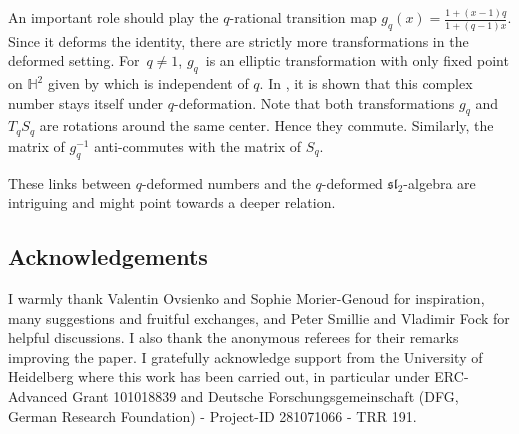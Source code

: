\documentclass[pdftex]{sigma}
\numberwithin{equation}{section}
\renewcommand*{\H}{\mathbb{H}}
\begin{document}
An important role should play the $q$-rational transition map $g_q(x)=\frac{1+(x-1)q}{1+(q-1)x}$. Since it deforms the identity, there are strictly more transformations in the deformed setting.
For~${q\neq 1}$, $g_q$~is an elliptic transformation with only fixed point on $\H^2$ given by  which is independent of $q$. In \cite[Part~2.3]{ovsienko2021towards}, it is shown that this complex number stays itself under $q$-deformation.
Note that both transformations $g_q$ and $T_qS_q$ are rotations around the same center. Hence they commute. Similarly, the matrix of $g_q^{-1}$ anti-commutes with the matrix of $S_q$.

These links between $q$-deformed numbers and the $q$-deformed $\mathfrak{sl}_2$-algebra are intriguing and might point towards a deeper relation.


\subsection*{Acknowledgements}

I warmly thank Valentin Ovsienko and Sophie Morier-Genoud for inspiration, many suggestions and fruitful exchanges, and Peter Smillie and Vladimir Fock for helpful discussions. I also thank the anonymous referees for their remarks improving the paper. I gratefully acknowledge support from the University of Heidelberg where this work has been carried out, in particular under ERC-Advanced Grant 101018839 and Deutsche Forschungsgemeinschaft (DFG, German Research Foundation) - Project-ID 281071066 - TRR 191.
\end{document}
